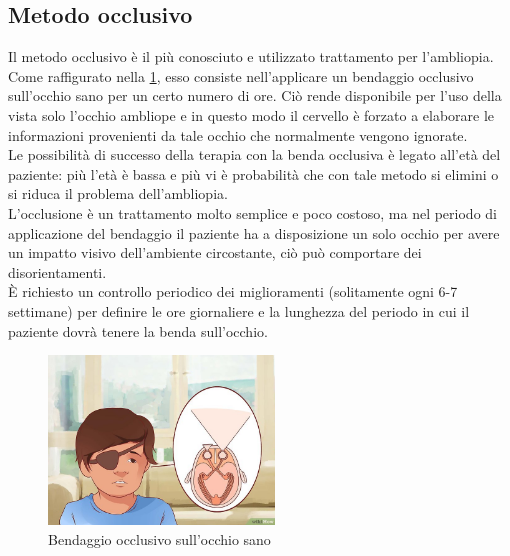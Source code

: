 \documentclass[12pt,a4paper,openright,twoside]{book}
\begin{document}
    \subsection{Metodo occlusivo}
  
	 Il metodo occlusivo è il più conosciuto e utilizzato trattamento per l'ambliopia. Come raffigurato nella \figurename \ref{fig:metoccl},
	 esso consiste nell'applicare un bendaggio occlusivo sull'occhio sano per un certo numero di ore. Ciò rende disponibile per l'uso della vista solo l'occhio 
	 ambliope e in questo modo il cervello è forzato a elaborare le informazioni provenienti da tale occhio che normalmente vengono ignorate.\\
	 Le possibilità di successo della terapia con la benda occlusiva è legato all'età del paziente: più l'età è bassa e più vi è probabilità che con tale metodo si elimini o si riduca il problema dell'ambliopia.\\
	 L'occlusione è un trattamento molto semplice e poco costoso, ma nel periodo di applicazione del bendaggio il paziente ha a disposizione un solo occhio per avere un impatto visivo dell'ambiente circostante, ciò può comportare dei disorientamenti.\\
	 È richiesto un controllo periodico dei miglioramenti (solitamente ogni 6-7 settimane) per definire le ore giornaliere e la lunghezza del periodo in cui il paziente dovrà 
	 tenere la benda sull'occhio.\\
	  \begin{figure}[h]
	 	\centering   	
	 	\includegraphics[width=60mm]{metoccl.jpg}
	 	\caption{Bendaggio occlusivo sull'occhio sano}
	 	\label{fig:metoccl}
	 \end{figure}
 
\end{document}
